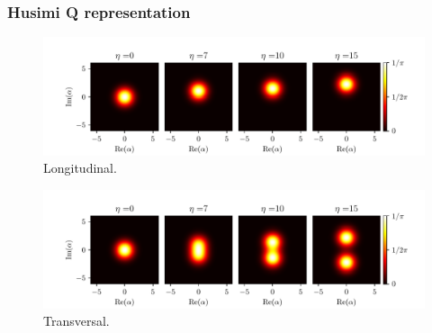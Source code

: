 \documentclass[pdflatex,compress]{beamer}
\begin{document}
\begin{frame}
\frametitle{Husimi Q representation}
\vspace{-1.5em}
\begin{figure}
\centering
\includegraphics[width=.9\textwidth]{images/qfunc_long.pdf}
\vspace*{-3mm}
\caption{Longitudinal.}
\end{figure}
\vspace{-2em}
\begin{figure}
\centering
\includegraphics[width=.9\textwidth]{images/qfunc_trans.pdf}
\vspace*{-3mm}
\caption{Transversal.}
\end{figure}
\end{frame}
\end{document}
